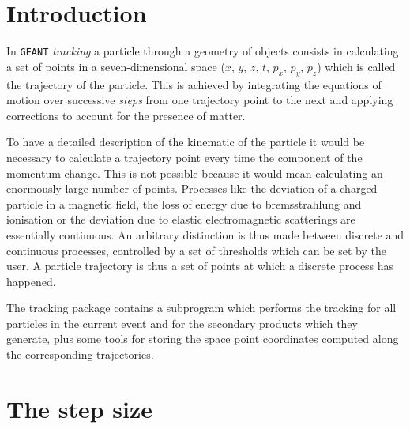       
       
\section{Introduction}
 
In {\tt GEANT} {\it tracking} a particle through a geometry of
objects consists in calculating a set of points in a seven-dimensional
space ($x$, $y$, $z$, $t$, $p_x$, $p_y$, $p_z$) which is called the
trajectory of the particle. This is achieved by integrating the equations 
of motion over successive {\it steps} from one trajectory point to the
next and applying corrections to account for the presence of matter. 

To have a detailed description of the kinematic of the particle it would
be necessary to calculate a trajectory point every time the component
of the momentum change. This is not possible because it would mean 
calculating an enormously large number of points. Processes like the
deviation of a charged particle in a magnetic field, the loss of energy
due to bremsstrahlung and ionisation or the deviation due to elastic
electromagnetic scatterings are essentially continuous. An arbitrary
distinction is thus made between discrete and continuous processes,
controlled by a set of thresholds which can be set by the user.
A particle trajectory is thus a set of points at which a discrete process
has happened. 

The tracking package contains a subprogram
which performs the tracking for
all particles in the current event and for the secondary
products which they generate, plus some tools
for storing the space point coordinates
computed along the corresponding trajectories.

\section{The step size}
 


